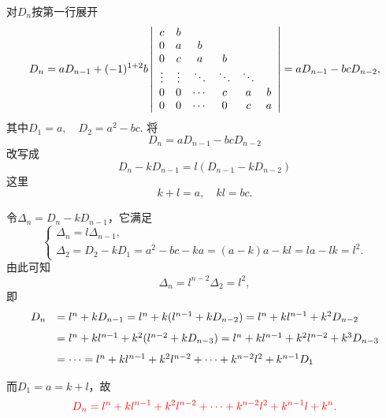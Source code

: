 \begin{frame}
\begin{jie}
  对$D_n$按第一行展开
  $$
  D_n =  aD_{n-1} + (-1)^{1+2} b \left|
    \begin{array}{cccccc}
      c&b&&&&\\
      0&a&b&&&\\
      0&c&a&b&&\\
      \vdots&\vdots&\ddots&\ddots&\ddots&\\
      0&0&\cdots&c&a&b\\
      0&0&\cdots&0&c&a
    \end{array}
  \right|  = a D_{n-1} - bc D_{n-2},
  $$
  其中$D_1=a, \quad D_2=a^2-bc$.
  将　
  $$D_n = a D_{n-1} - bc D_{n-2}$$
  改写成 
  $$
  D_n - k D_{n-1} = l(D_{n-1} - k D_{n-2})
  $$ 
  这里
  $$
  k+l=a, \quad kl = bc.
  $$    
\end{jie}
\end{frame}

\begin{frame}
  令$\Delta_n = D_n-kD_{n-1}$，它满足
  $$
  \left\{
    \begin{array}{l}
      \Delta_n = l\Delta_{n-1},  \\[0.05in] 
      \Delta_2 = D_2-kD_1 = a^2-bc - ka = (a-k)a-kl=la-lk=l^2.
    \end{array}    
  \right.
  $$ 
  由此可知
  $$
  \Delta_n = l^{n-2} \Delta_2 = l^2, 
  $$
  即
  $$
  \begin{array}{rl}
    D_n &  = l^n  + k D_{n-1}  = l^n  + k (l^{n-1}  + k D_{n-2}) 
          = l^n  + k l^{n-1}  + k^2 D_{n-2} \\[0.1in]
        & =  l^n  + k l^{n-1}  + k^2 (l^{n-2}  + k D_{n-3} )
          = l^n  + k l^{n-1}  + k^2 l^{n-2}  + k^3 D_{n-3} \\[0.1in]
        & = \cdots  =  l^n  + k l^{n-1}  + k^2 l^{n-2}  + \cdots + k^{n-2}l^2 + k^{n-1} D_1
  \end{array}
  $$ 

  而$D_1 = a = k+l$，故
  $$
  \textcolor{red}{
    D_n = l^n  + k l^{n-1}  + k^2 l^{n-2}  + \cdots + k^{n-2}l^2 + k^{n-1}l + k^n.
  }
  $$


\end{frame}